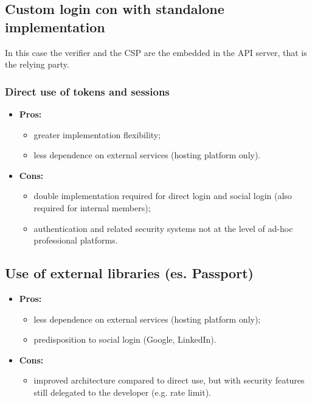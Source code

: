 \subsection{Custom login con with standalone implementation}
In this case the verifier and the CSP are the embedded in the API server, that is the relying party.
\subsubsection*{Direct use of tokens and sessions}
\begin{itemize}
	\item \textbf{Pros:}
	\begin{itemize}
		\item greater implementation flexibility;
		\item less dependence on external services (hosting platform only).
	\end{itemize}
	\item \textbf{Cons:}
	\begin{itemize}
		\item double implementation required for direct login and social login (also required for internal members);
		\item authentication and related security systems not at the level of ad-hoc professional platforms.
	\end{itemize}
\end{itemize}

\subsection*{Use of external libraries (es. Passport)}
\begin{itemize}
	\item \textbf{Pros:}
	\begin{itemize}
		\item less dependence on external services (hosting platform only);
		\item predisposition to social login (Google, LinkedIn).
	\end{itemize}
	\item \textbf{Cons:}
	\begin{itemize}
		\item improved architecture compared to direct use, but with security features still delegated to the developer (e.g. rate limit).
	\end{itemize}
\end{itemize}

